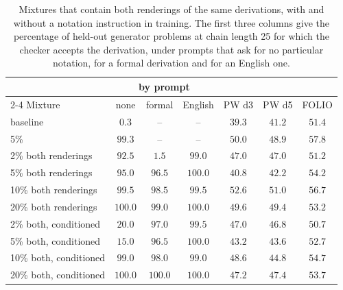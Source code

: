 \begin{table}[t]
\caption{Mixtures that contain both renderings of the same derivations, with and without a notation instruction in training. The first three columns give the percentage of held-out generator problems at chain length 25 for which the checker accepts the derivation, under prompts that ask for no particular notation, for a formal derivation and for an English one.}
\label{tab:mixed}
\begin{center}
\footnotesize
\begin{tabular}{lcccccc}
\toprule
 & \multicolumn{3}{c}{\branchproof{} by prompt} & & & \\
\cmidrule(lr){2-4}
Mixture & none & formal & English & PW d3 & PW d5 & FOLIO \\
\midrule
baseline                        & $0.3$  & --     & --      & $39.3$ & $41.2$ & $51.4$ \\
5\% \formal{}                  & $99.3$ & --     & --      & $50.0$ & $48.9$ & $57.8$ \\
\midrule
2\% both renderings            & $92.5$ & $1.5$  & $99.0$  & $47.0$ & $47.0$ & $51.2$ \\
5\% both renderings            & $95.0$ & $96.5$ & $100.0$ & $40.8$ & $42.2$ & $54.2$ \\
10\% both renderings           & $99.5$ & $98.5$ & $99.5$  & $52.6$ & $51.0$ & $56.7$ \\
20\% both renderings           & $100.0$ & $99.0$ & $100.0$ & $49.6$ & $49.4$ & $53.2$ \\
2\% both, conditioned          & $20.0$ & $97.0$ & $99.5$  & $47.0$ & $46.8$ & $50.7$ \\
5\% both, conditioned          & $15.0$ & $96.5$ & $100.0$ & $43.2$ & $43.6$ & $52.7$ \\
10\% both, conditioned         & $99.0$ & $98.0$ & $99.0$  & $48.6$ & $44.8$ & $54.7$ \\
20\% both, conditioned         & $100.0$ & $100.0$ & $100.0$ & $47.2$ & $47.4$ & $53.7$ \\
\bottomrule
\end{tabular}
\end{center}
\end{table}
